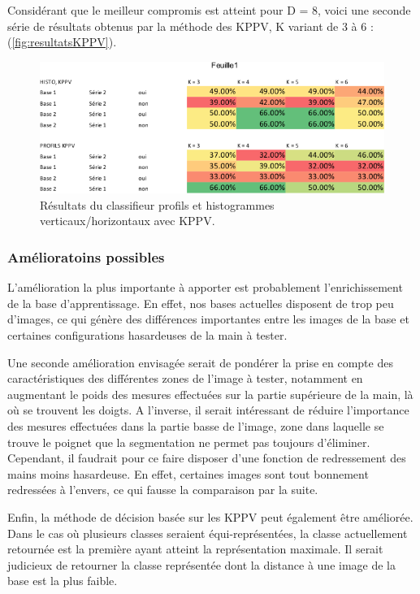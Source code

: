 Considérant que le meilleur compromis est atteint pour D = 8, voici une seconde série de résultats obtenus par la méthode des KPPV, K variant de 3 à 6 : (\autoref{fig:resultatsKPPV}).

\begin{figure}[htb!]
\centerline{\includegraphics[scale=0.7]{table1.png}}
\caption{Résultats du classifieur profils et histogrammes verticaux/horizontaux avec KPPV.}
\label{fig:resultatsKPPV}
\end{figure}

\subsubsection{Amélioratoins possibles}
L'amélioration la plus importante à apporter est probablement l'enrichissement de la base d'apprentissage. En effet, nos bases actuelles disposent de trop peu d'images, ce qui génère des différences importantes entre les images de la base et certaines configurations hasardeuses de la main à tester.

	Une seconde amélioration envisagée serait de pondérer la prise en compte des caractéristiques des différentes zones de l'image à tester, notamment en augmentant le poids des mesures effectuées sur la partie supérieure de la main, là où se trouvent les doigts. A l'inverse, il serait intéressant de réduire l'importance des mesures effectuées dans la partie basse de l'image, zone dans laquelle se trouve le poignet que la segmentation ne permet pas toujours d'éliminer. Cependant, il faudrait pour ce faire disposer d'une fonction de redressement des mains moins hasardeuse. En effet, certaines images sont tout bonnement redressées à l'envers, ce qui fausse la comparaison par la suite.

	Enfin, la méthode de décision basée sur les KPPV peut également être améliorée. Dans le cas où plusieurs classes seraient équi-représentées, la classe actuellement retournée est la première ayant atteint la représentation maximale. Il serait judicieux de retourner la classe représentée dont la distance à une image de la base est la plus faible.

